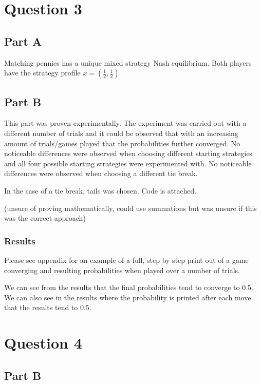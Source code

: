 \documentclass[11pt]{article}
\begin{document}
\section{Question 3}

\subsection{Part A}
Matching pennies has a unique mixed strategy Nash equilibrium. Both players have the strategy profile $x = (\frac{1}{2}, \frac{1}{2})$

\subsection{Part B}

This part was proven experimentally. The experiment was carried out with a different number of trials and it could be observed that with an increasing amount of trials/games played that the probabilities further converged. No noticeable differences were observed when choosing different starting strategies and all four possible starting strategies were experimented with. No noticeable differences were observed when choosing a different tie break.

In the case of a tie break, tails was chosen. Code is attached.

(unsure of proving mathematically, could use summations but was unsure if this was the correct approach)

\subsubsection*{Results}
Please see appendix for an example of a full, step by step print out of a game converging and resulting probabilities when played over a number of trials.

We can see from the results that the final probabilities tend to converge to 0.5. We can also see in the results where the probability is printed after each move that the results tend to 0.5.



\section{Question 4}

\subsection{Part B}
\end{document}
